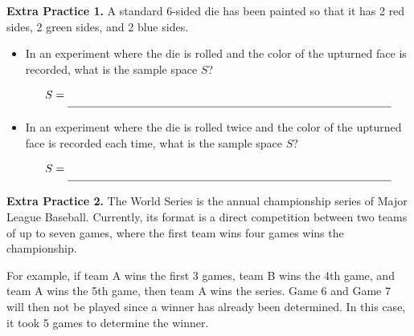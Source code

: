 \documentclass[10pt]{article}
\begin{document}
\newpage 


%
%
%
%
%
%
%





\newpage%

{\bf\color{blue} Extra Practice 1.} \reversemarginpar{}  A standard 6-sided die has been painted so that it has 2 {\color{red}red} sides, 2 {\color{ForestGreen}green} sides, and 2 {\color{blue}blue} sides.

\begin{itemize}
    \item[(a)] In an experiment where the die is rolled and the color of the upturned face is recorded, what is the sample space $S$?

    {\Large
    \[
    S = \rule[-8pt]{4in}{0.4pt}
    \]
    }
    
    \item[(b)] In an experiment where the die is rolled twice and the color of the upturned face is recorded each time, what is the sample space $S$?

    {\Large
    \[
    S = \rule[-8pt]{4in}{0.4pt}
    \]
    }
    
\end{itemize}

{\bf\color{blue}Extra Practice 2.}\reversemarginpar{} 
The World Series is the annual championship series of Major League Baseball. Currently, its format is a direct competition between two teams of up to seven games, where the first team wins four games wins the championship.

For example, if team A wins the first 3 games, team B wins the 4th game, and team A wins the 5th game, then team A wins the series. Game 6 and Game 7 will then not be played since a winner has already been determined. In this case, it took 5 games to determine the winner.
\end{document}

